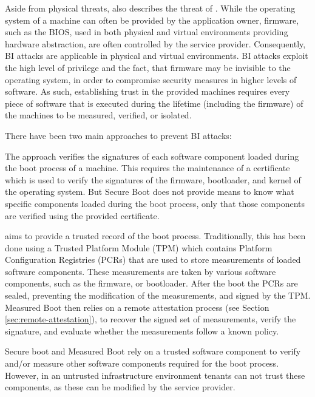\begin{description}
    Aside from physical threats, \citeauthor{weis2014protecting} also describes
    the threat of . While the operating
    system of a machine can often be provided by the application owner,
    firmware, such as the BIOS, used in both physical and virtual environments
    providing hardware abstraction, are often controlled by the service
    provider. Consequently, BI attacks are applicable in physical and virtual
    environments. BI attacks exploit the high level of privilege and the fact,
    that firmware may be invisible to the operating system, in order to
    compromise security measures in higher levels of software. As such,
    establishing trust in the provided machines requires every piece of software
    that is executed during the lifetime (including the firmware) of the
    machines to be measured, verified, or isolated.

    There have been two main approaches to prevent BI attacks:

    The  approach verifies the signatures of each software
    component loaded during the boot process of a machine. This requires the
    maintenance of a certificate which is used to verify the signatures of the
    firmware, bootloader, and kernel of the operating system. But Secure Boot
    does not provide means to know what specific components loaded during the
    boot process, only that those components are verified using the provided
    certificate.
    
     aims to provide a trusted record of the boot process.
    Traditionally, this has been done using a Trusted Platform Module (TPM)
    which contains Platform Configuration Registries (PCRs) that are used to
    store measurements of loaded software components. These measurements are
    taken by various software components, such as the firmware, or bootloader.
    After the boot the PCRs are sealed, preventing the modification of the
    measurements, and signed by the TPM. Measured Boot then relies on a remote
    attestation process (see Section \ref{sec:remote-attestation}), to recover
    the signed set of measurements, verify the signature, and evaluate whether
    the measurements follow a known policy.

    Secure boot and Measured Boot rely on a trusted software component to verify
    and/or measure other software components required for the boot process.
    However, in an untrusted infrastructure environment tenants can not trust
    these components, as these can be modified by the service provider.
\end{description}

